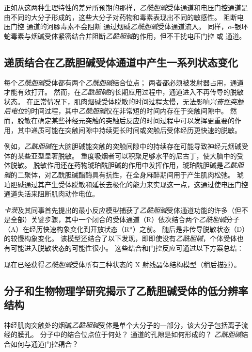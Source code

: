 正如从这两种生理特性的差异所预期的那样，\textit{乙酰胆碱}受体通道和电压门控通道是由不同的大分子形成的，这些大分子对药物和毒素表现出不同的敏感性。
阻断电压门控  通道的河豚毒素不会阻断  通过烟碱\textit{乙酰胆碱}受体通道流入。
同样，$\alpha$-银环蛇毒素与烟碱受体紧密结合并阻断\textit{乙酰胆碱}的作用，但不干扰电压门控  或  通道。



\subsection{递质结合在乙酰胆碱受体通道中产生一系列状态变化}

每个\textit{乙酰胆碱}受体都有两个\textit{乙酰胆碱}结合位点；
两者都必须被发射器占用，通道才能有效打开。
然而，在\textit{乙酰胆碱}的长期应用过程中，通道进入不再传导的脱敏状态。
在正常情况下，肌肉烟碱受体脱敏的时间过程太慢，无法影响\textit{兴奋性突触后电位}的时间过程，其中\textit{乙酰胆碱}仅在非常短的时间内存在于突触间隙中。
然而，脱敏在确定某些神经元突触的突触后反应的时间过程中可以发挥更重要的作用，其中递质可能在突触间隙中持续更长时间或突触后受体经历更快速的脱敏。


例如，\textit{乙酰胆碱}在大脑胆碱能突触的突触间隙中的持续存在可能导致神经元烟碱受体的某些亚型显著脱敏。
重度吸烟者可以积聚足够水平的尼古丁，使大脑中的受体脱敏。
脱敏作用还在药物琥珀酰胆碱的作用中发挥作用，琥珀酰胆碱是\textit{乙酰胆碱}的二聚体，对乙酰胆碱酯酶具有抗性，在全身麻醉期间用于产生肌肉松弛。
琥珀胆碱通过其产生受体脱敏和延长去极化的能力来实现这一点，这通过使电压门控  通道失活来阻断肌肉动作电位。


\textit{卡茨}及其同事首先提出的最小反应模型捕获了\textit{乙酰胆碱}受体通道功能的许多（但不是全部）关键步骤，其中一个闭合的受体通道（R）依次结合两个\textit{乙酰胆碱}分子（A）在经历快速构象变化到开放状态（R*）之前。
随后是非传导脱敏状态（D）的较慢构象变化。
该模型还结合了以下发现，即即使没有\textit{乙酰胆碱}，个体受体也有可能进入脱敏状态的可能性很小。
这些结合和门控反应可通过以下方案总结：


现在已经获得\textit{乙酰胆碱}受体所有三种状态的 X 射线晶体结构模型（稍后描述）。



\subsection{分子和生物物理学研究揭示了乙酰胆碱受体的低分辨率结构}

神经肌肉突触处的烟碱\textit{乙酰胆碱}受体是单个大分子的一部分，该大分子包括离子流经的膜孔。
分子中的结合位点位于何处？ 通道的孔隙是如何形成的？
\textit{乙酰胆碱}结合如何与通道门控耦合？


